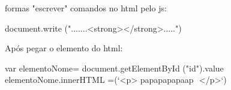 formas "escrever" comandos no html pelo js:

document.write (".......<strong></strong>.....")

Após pegar o elemento do html:

var elementoNome= document.getElementById ("id").value
elementoNome.innerHTML =(`<p> papapapapaap ${}$ </p>`)
